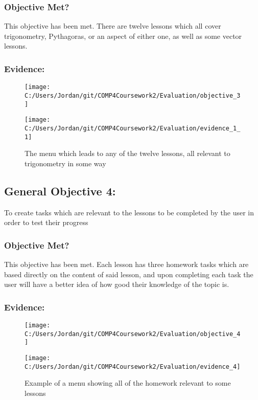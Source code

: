 \subsubsection{Objective Met?}

This objective has been met. There are twelve lessons which all cover trigonometry, Pythagoras, or an aspect of either one, as well as some vector lessons.

\subsubsection{Evidence: }

\begin{figure}[H]
	\texttt{[image: C:/Users/Jordan/git/COMP4Coursework2/Evaluation/objective\_3]}
\end{figure}

\begin{figure}[H]
	\texttt{[image: C:/Users/Jordan/git/COMP4Coursework2/Evaluation/evidence\_1\_1]}
	\caption{The menu which leads to any of the twelve lessons, all relevant to trigonometry in some way}
\end{figure}

\subsection{General Objective 4: }

To create tasks which are relevant to the lessons to be completed by the user in order to test their progress

\subsubsection{Objective Met?}

This objective has been met. Each lesson has three homework tasks which are based directly on the content of said lesson, and upon completing each task the user will have a better idea of how good their knowledge of the topic is.

\subsubsection{Evidence: }

\begin{figure}[H]
	\texttt{[image: C:/Users/Jordan/git/COMP4Coursework2/Evaluation/objective\_4]}
\end{figure}

\begin{figure}[H]
	\texttt{[image: C:/Users/Jordan/git/COMP4Coursework2/Evaluation/evidence\_4]}
	\caption{Example of a menu showing all of the homework relevant to some lessons}
\end{figure}


